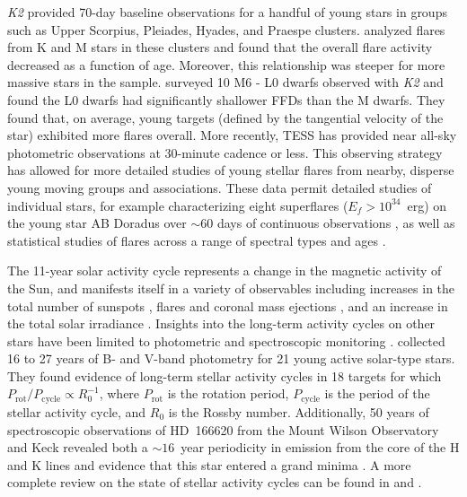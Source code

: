 \documentclass[twocolumn, linenumbers]{aastex631}
\begin{document}
\textit{K2} provided 70-day baseline observations for a handful of young stars in groups such as Upper Scorpius,  Pleiades, Hyades, and Praespe clusters. \cite{ilin19, ilin21}
analyzed flares from K and M stars in these clusters and found that the overall flare activity decreased as a function of age. Moreover, this relationship was steeper for
more massive stars in the sample. \cite{paudel18} surveyed 10 M6 - L0 dwarfs observed with \textit{K2} and found the L0 dwarfs had significantly shallower FFDs than the M
dwarfs. They found that, on average, young targets (defined by the tangential velocity of the star) exhibited more flares overall. More recently, TESS \citep{ricker15} has
provided near all-sky photometric observations at 30-minute cadence or less. This observing strategy has allowed for more detailed studies of young stellar flares from nearby,
disperse young moving groups and associations. These  data permit detailed studies of individual stars, for example characterizing eight superflares ($E_f > 10^{34}$~erg) on
the young star AB Doradus over $\sim 60$ days of continuous observations \citep{schmitt19}, as well as statistical studies of flares across a range of spectral types and ages
\citep{doyle20, feinstein22_criticality, pietras22, yang23}.

The 11-year solar activity cycle represents a change in the magnetic activity of the Sun, and manifests itself in a variety of observables including increases in the total
number of sunspots \citep{clette14, kilcik14}, flares and coronal mass ejections \citep{crossby93, webb94, lin23}, and an increase in the total solar irradiance \citep{lean1987}.
Insights into the long-term activity cycles on other stars have been limited to photometric and spectroscopic monitoring \citep{saar99}. \cite{lehtinen16} collected 16 to 27 years
of B- and V-band photometry for 21 young active solar-type stars. They found evidence of long-term stellar activity cycles in 18 targets for which$P_\textrm{rot}/P_\textrm{cycle}
\propto R_0^{-1}$, where $P_\textrm{rot}$ is the rotation period, $P_\textrm{cycle}$ is the period of the stellar activity cycle, and $R_0$ is the Rossby number. Additionally,
50 years of spectroscopic observations of HD~166620 from the Mount Wilson Observatory and Keck revealed both a $\sim 16$~year periodicity in emission from the core of the
 H and K lines \citep{olah16} and evidence that this star entered a grand minima \citep{baum22}. A more complete review on the state of stellar activity cycles can be
found in \cite{jeffers23} and \cite{isik23}.
\end{document}
